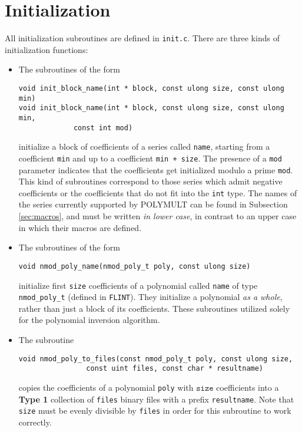\documentclass[a4paper,10pt]{article}
\newcommand{\code}{\lstinline}
\begin{document}
\section{Initialization} \label{sec:init}

All initialization subroutines are defined in \code{init.c}. There are three kinds of initialization functions:

\begin{itemize}
\item The subroutines of the form
%
\begin{lstlisting}
void init_block_name(int * block, const ulong size, const ulong min)
void init_block_name(int * block, const ulong size, const ulong min,
		     const int mod)
\end{lstlisting}
%
initialize a block of coefficients of a series called \code{name}, starting from a coefficient \code{min} and up to a coefficient \code{min + size}. The presence of a \code{mod} parameter indicates that the coefficients get initialized modulo a prime \code{mod}. This kind of subroutines correspond to those series which admit negative coefficients or the coefficients that do not fit into the \code{int} type. The names of the series currently supported by POLYMULT can be found in Subsection \ref{sec:macros}, and must be written \emph{in lower case}, in contrast to an upper case in which their macros are defined.

\item The subroutines of the form
%
\begin{lstlisting}
void nmod_poly_name(nmod_poly_t poly, const ulong size)
\end{lstlisting}
%
initialize first \code{size} coefficients of a polynomial called \code{name} of type \code{nmod_poly_t} (defined in \code{FLINT}). They initialize a polynomial \emph{as a whole}, rather than just a block of its coefficients. These subroutines utilized solely for the polynomial inversion algorithm.

\item The subroutine
%
\begin{lstlisting}
void nmod_poly_to_files(const nmod_poly_t poly, const ulong size,
		        const uint files, const char * resultname)
\end{lstlisting}
%
copies the coefficients of a polynomial \code{poly} with $\texttt{size}$ coefficients into a \textbf{Type 1} collection of \code{files} binary files with a prefix \code{resultname}. Note that \code{size} must be evenly divisible by \code{files} in order for this subroutine to work correctly.
\end{itemize}
\end{document}
